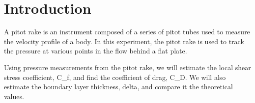 \chapter{Introduction}
\label{cp:introduction}
A pitot rake is an instrument composed of a series of pitot tubes used to measure the velocity profile of a body. In this experiment, the pitot rake is used to track the pressure at various points in the flow behind a flat plate. 

Using pressure measurements from the pitot rake, we will estimate the local shear stress coefficient, \gls{C_f}, and find the coefficient of drag, \gls{C_D}. We will also estimate the boundary layer thickness, \gls{delta}, and compare it the theoretical values. 